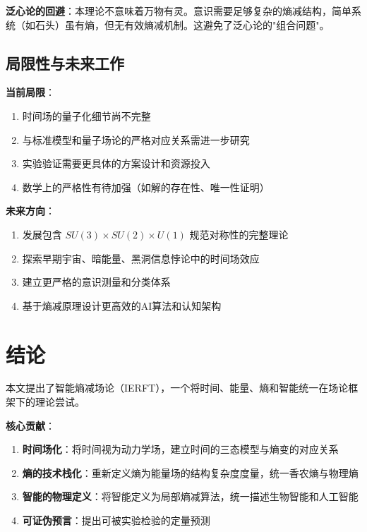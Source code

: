 \documentclass[12pt,a4paper]{article}
\begin{document}
\textbf{泛心论的回避}：本理论不意味着万物有灵。意识需要足够复杂的熵减结构，简单系统（如石头）虽有熵，但无有效熵减机制。这避免了泛心论的"组合问题"。

\subsection{局限性与未来工作}

\textbf{当前局限}：
\begin{enumerate}
\item 时间场的量子化细节尚不完整
\item 与标准模型和量子场论的严格对应关系需进一步研究
\item 实验验证需要更具体的方案设计和资源投入
\item 数学上的严格性有待加强（如解的存在性、唯一性证明）
\end{enumerate}

\textbf{未来方向}：
\begin{enumerate}
\item 发展包含 $SU(3) \times SU(2) \times U(1)$ 规范对称性的完整理论
\item 探索早期宇宙、暗能量、黑洞信息悖论中的时间场效应
\item 建立更严格的意识测量和分类体系
\item 基于熵减原理设计更高效的AI算法和认知架构
\end{enumerate}

\section{结论}

本文提出了智能熵减场论（IERFT），一个将时间、能量、熵和智能统一在场论框架下的理论尝试。

\textbf{核心贡献}：
\begin{enumerate}
\item \textbf{时间场化}：将时间视为动力学场，建立时间的三态模型与熵变的对应关系
\item \textbf{熵的技术栈化}：重新定义熵为能量场的结构复杂度度量，统一香农熵与物理熵
\item \textbf{智能的物理定义}：将智能定义为局部熵减算法，统一描述生物智能和人工智能
\item \textbf{可证伪预言}：提出可被实验检验的定量预测
\end{enumerate}
\end{document}
